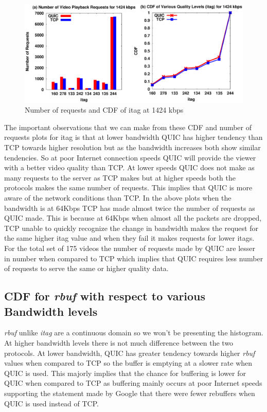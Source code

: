 \begin{figure}[h]
    \centering
    \includegraphics[width=\linewidth]{img/CDF/plot_itag_1458176}
    \caption{Number of requests and CDF of itag at 1424 kbps}
    \label{fig:itag76111}
\end{figure}

The important observations that we can make from these CDF and number of requests plots for itag is that at lower bandwidth QUIC has higher tendency than TCP towards higher resolution but as the bandwidth increases both show similar tendencies. So at poor Internet connection speeds QUIC will provide the viewer with a better video quality than TCP. At lower speeds QUIC does not make as many requests to the server as TCP makes but at higher speeds both the protocols makes the same number of requests. This implies that QUIC is more aware of the network conditions than TCP. In the above plots when the bandwidth is at 64Kbps TCP has made almost twice the number of requests as QUIC made. This is because at 64Kbps when almost all the packets are dropped, TCP unable to quickly recognize the change in bandwidth makes the request for the same higher itag value and when they fail it makes requests for lower itags. For the total set of 175 videos the number of requests made by QUIC are lesser in number when compared to TCP which implies that QUIC requires less number of requests to serve the same or higher quality data.

\subsection{CDF for \textit{rbuf} with respect to various Bandwidth levels}
\textit{rbuf} unlike \textit{itag} are a continuous domain so we won't be presenting the histogram. At higher bandwidth levels there is not much difference between the two protocols. At lower bandwidth, QUIC has greater tendency towards higher \textit{rbuf} values when compared to TCP so the buffer is emptying at a slower rate when QUIC is used. This majorly implies that the chance for buffering is lower for QUIC when compared to TCP as buffering mainly occurs at poor Internet speeds supporting the statement made by Google that there were fewer rebuffers when QUIC is used instead of TCP.


